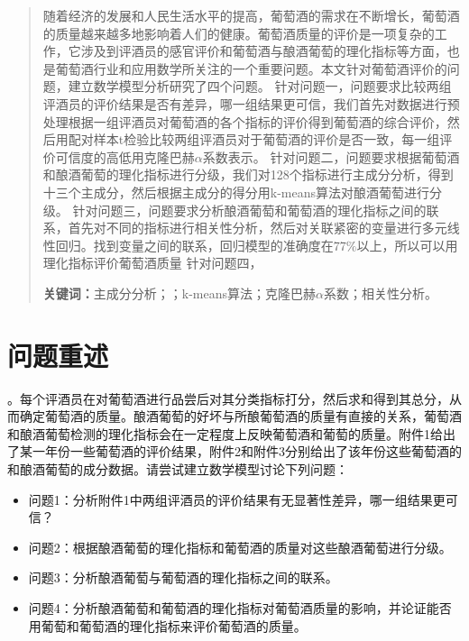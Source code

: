 \documentclass[UTF8,12.05pt]{ctexart}
\begin{document}

\begin{center}
\end{center}

\vspace{1cm}
\begin{abstract}
随着经济的发展和人民生活水平的提高，葡萄酒的需求在不断增长，葡萄酒的质量越来越多地影响着人们的健康。葡萄酒质量的评价是一项复杂的工作，它涉及到评酒员的感官评价和葡萄酒与酿酒葡萄的理化指标等方面，也是葡萄酒行业和应用数学所关注的一个重要问题。本文针对葡萄酒评价的问题，建立数学模型分析研究了四个问题。
\newline
针对问题一，问题要求比较两组评酒员的评价结果是否有差异，哪一组结果更可信，我们首先对数据进行预处理根据一组评酒员对葡萄酒的各个指标的评价得到葡萄酒的综合评价，然后用配对样本t检验比较两组评酒员对于葡萄酒的评价是否一致，每一组评价可信度的高低用克隆巴赫$\alpha$系数表示。
\newline
针对问题二，问题要求根据葡萄酒和酿酒葡萄的理化指标进行分级，我们对128个指标进行主成分分析，得到十三个主成分，然后根据主成分的得分用k-means算法对酿酒葡萄进行分级。
\newline
针对问题三，问题要求分析酿酒葡萄和葡萄酒的理化指标之间的联系，首先对不同的指标进行相关性分析，然后对关联紧密的变量进行多元线性回归。找到变量之间的联系，回归模型的准确度在77$\%$以上，所以可以用理化指标评价葡萄酒质量
\newline
针对问题四，
\begin{flushleft}
  \textbf{关键词：}主成分分析；；\quad k-means算法；\quad 克隆巴赫$\alpha$系数；相关性分析。
\end{flushleft}

\end{abstract}
\newpage
\pagestyle{plain}
\setcounter{page}{1}
\section{\heiti{}问题重述}
。每个评酒员在对葡萄酒进行品尝后对其分类指标打分，然后求和得到其总分，从而确定葡萄酒的质量。酿酒葡萄的好坏与所酿葡萄酒的质量有直接的关系，葡萄酒和酿酒葡萄检测的理化指标会在一定程度上反映葡萄酒和葡萄的质量。附件1给出了某一年份一些葡萄酒的评价结果，附件2和附件3分别给出了该年份这些葡萄酒的和酿酒葡萄的成分数据。请尝试建立数学模型讨论下列问题：
\begin{itemize}
  \item 问题1：分析附件1中两组评酒员的评价结果有无显著性差异，哪一组结果更可信？
  \item 问题2：根据酿酒葡萄的理化指标和葡萄酒的质量对这些酿酒葡萄进行分级。
  \item 问题3：分析酿酒葡萄与葡萄酒的理化指标之间的联系。
  \item 问题4：分析酿酒葡萄和葡萄酒的理化指标对葡萄酒质量的影响，并论证能否用葡萄和葡萄酒的理化指标来评价葡萄酒的质量。
\end{itemize}
\end{document}
